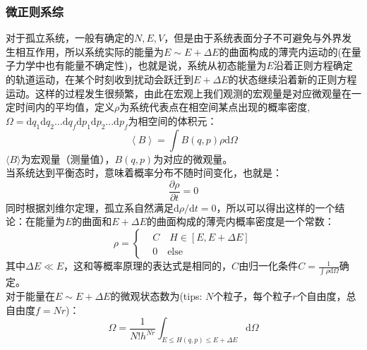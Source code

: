 \documentclass[12pt]{article}
\begin{document}
\subsubsection{微正则系综}
\noindent
对于孤立系统，一般有确定的$N,E,V$，但是由于系统表面分子不可避免与外界发生相互作用，所以系统实际的能量为$E\sim E+\Delta E$的曲面构成的薄壳内运动的(在量子力学中也有能量不确定性)，也就是说，系统从初态能量为$E$沿着正则方程确定的轨道运动，在某个时刻收到扰动会跃迁到$E+\Delta E$的状态继续沿着新的正则方程运动。这样的过程发生很频繁，由此在宏观上我们观测的宏观量是对应微观量在一定时间内的平均值，定义$\rho$为系统代表点在相空间某点出现的概率密度, $\Omega=\mathrm{d}q_1\mathrm{d}q_2...\mathrm{d}q_f\mathrm{d}p_1\mathrm{d}p_2...\mathrm{d}p_f$为相空间的体积元：
\begin{equation}
	\left\langle{B}\right\rangle=\int B(q,p)\rho\mathrm{d}\Omega
\end{equation}
$\langle{B}\rangle$为宏观量（测量值），$B(q,p)$为对应的微观量。\\
当系统达到平衡态时，意味着概率分布不随时间变化，也就是：
\begin{equation}
	\frac{\partial \rho}{\partial t}=0
\end{equation}
同时根据刘维尔定理，孤立系自然满足$\mathrm{d}\rho/\mathrm{d}t=0$，所以可以得出这样的一个结论：在能量为$E$的曲面和$E+\Delta E$的曲面构成的薄壳内概率密度是一个常数：
\begin{equation}
	\rho =\left\{ \begin{split}
		&C\quad
			 H\in [E,E+\Delta E]  \\
		&0\quad
			 \text{else}  
	\end{split} \right.	
\end{equation}
其中$\Delta E\ll E$，这和等概率原理的表达式是相同的，$C$由归一化条件$C=\frac{1}{\int \rho\mathrm{d}\Omega}$确定。\\
对于能量在$E\sim E+\Delta E$的微观状态数为(tips: $N$个粒子，每个粒子$r$个自由度，总自由度$f=Nr$)：
\begin{equation}
	\Omega=\frac{1}{N!h^{Nr}}\int_{E\le H(q,p)\le E+\Delta E} \mathrm{d}\Omega
\end{equation}

	
\end{document}
